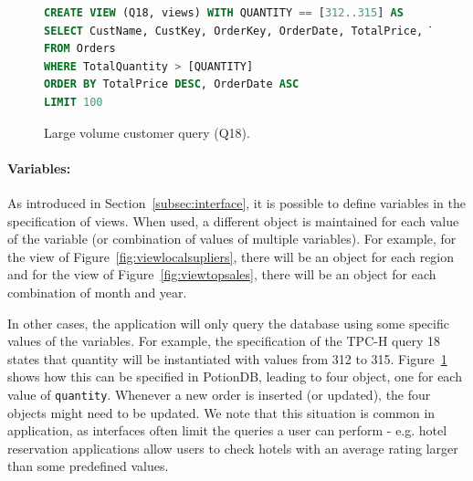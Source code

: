 \documentclass[sigplan,twocolumn,review,anonymous]{acmart}
\begin{document}
\begin{figure}[t]
	\begin{lstlisting}[language=SQL]
CREATE VIEW (Q18, views) WITH QUANTITY == [312..315] AS
SELECT CustName, CustKey, OrderKey, OrderDate, TotalPrice, TotalQuantity
FROM Orders
WHERE TotalQuantity > [QUANTITY]
ORDER BY TotalPrice DESC, OrderDate ASC
LIMIT 100
	\end{lstlisting}
	\vspace{-10pt}
	\caption{Large volume customer query (Q18).}
	\vspace{-10pt}
	\label{fig:q18_view}
\end{figure}


\paragraph{Variables:} As introduced in Section~\ref{subsec:interface}, it is possible to define 
variables in the specification of views. %
When used, a different object is maintained for each
value of the variable (or combination of values of multiple variables). 
For example, for the view of Figure~\ref{fig:viewlocalsupliers}, there
will be an object for each region and for the view of Figure~\ref{fig:viewtopsales}, there 
will be an object for each combination of month and year.

In other cases, the application will only query the database using some specific values of the
variables. For example, the specification of the TPC-H query 18 states that quantity will be instantiated with values
from 312 to 315. 
Figure~\ref{fig:q18_view} shows how this can be specified in PotionDB, leading to four object, 
one for each value of \texttt{quantity}. Whenever a new
order is inserted (or updated), the four objects might need to be updated.
We note that this situation is common in application, as interfaces often limit the queries a user can 
perform - e.g. hotel reservation applications allow users to check hotels with an average 
rating larger than some predefined values.

\end{document}
